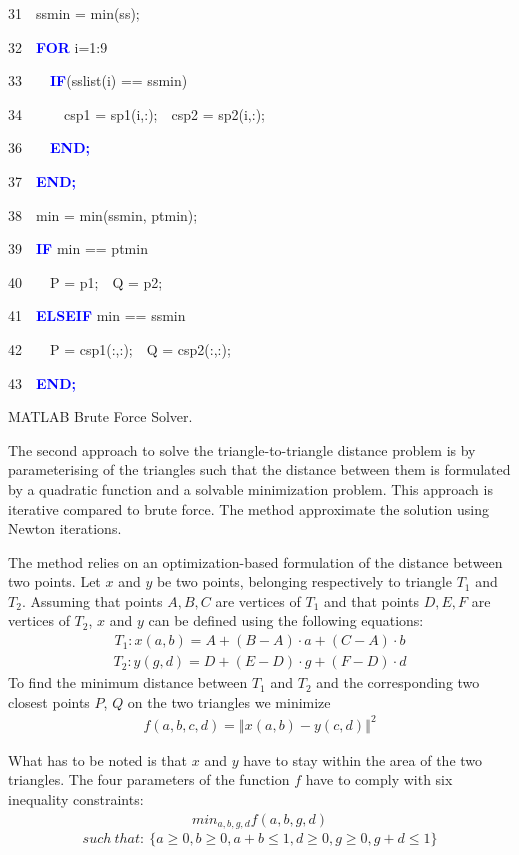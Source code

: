 \documentclass[times,12pt]{article}
\begin{document}
\begin{algorithm}
31~~ssmin = min(ss);

32~~\textbf{\textcolor{blue}{FOR}} i=1:9

33~~~~\textbf{\textcolor{blue}{IF}}(sslist(i) == ssmin)

34~~~~~~csp1 = sp1(i,:);~~csp2 = sp2(i,:);

36~~~~\textbf{\textcolor{blue}{END;}}

37~~\textbf{\textcolor{blue}{END;}}

38~~min = min(ssmin, ptmin);

39~~\textbf{\textcolor{blue}{IF}} min == ptmin

40~~~~P = p1;~~Q = p2;

41~~\textbf{\textcolor{blue}{ELSEIF}} min == ssmin

42~~~~P = csp1(:,:);~~Q = csp2(:,:);

43~~\textbf{\textcolor{blue}{END;}}
\protect\caption{\label{alg3}MATLAB Brute Force Solver.}
\end{algorithm}
\clearpage


The second approach to solve the triangle-to-triangle  distance problem is by parameterising of the triangles such that the distance between them is formulated by a quadratic function and a solvable minimization problem. This approach is iterative compared to brute force. The method approximate the solution using Newton iterations.

The method relies on an optimization-based formulation of the distance between two points. Let $x$ and $y$ be two points, belonging respectively to triangle $T_1$ and $T_2$. Assuming that points $A, B, C$ are vertices of $T_1$ and that points $D, E, F$ are vertices of $T_2$, $x$ and $y$ can be defined using the following equations: 
\begin{align*}
T_{1}:x(a,b)=A+(B-A) \cdot a+(C-A)\cdot b
\end{align*}
\begin{align*}
T_{2}:y(g,d)=D+(E-D) \cdot g+(F-D) \cdot d
\end{align*} 
To find the minimum distance between $T_1$ and $T_2$ and the corresponding two closest points $P$, $Q$ on the two triangles we minimize
\begin{align*}
f\left(a,b,c,d\right)=\left\Vert x\left(a,b\right)-y\left(c,d\right)\right\Vert ^{2}
\end{align*} 

What has to be noted is that $x$ and $y$ have to stay within the area of the two triangles. The four parameters of the function $f$ have to comply with six inequality constraints:
\begin{align*}
min_{a,b,g,d} f(a,b,g,d)
\end{align*}  
$$such \:that: \: \{a\geq0,b\geq0, a+b\leq1, d\geq0, g\geq0, g+d\leq1 \}$$ 
\end{document}
